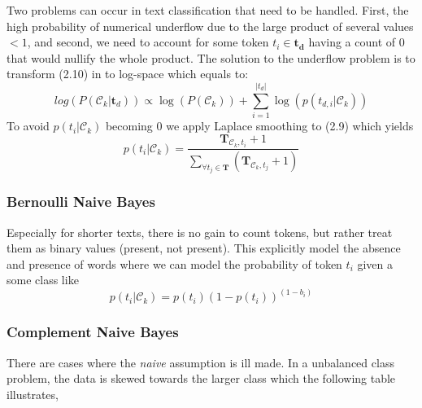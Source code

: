 Two problems can occur in text classification that need to be handled. First, the high probability of numerical underflow due to the large product of several values $<1$, and second, we need to account for some token $t_i \in \boldsymbol{t_d}$ having a count of $0$ that would nullify the whole product. The solution to the underflow problem is to transform (2.10) in to log-space which equals to:
%
\[log(P(\mathcal{C}_k|\boldsymbol{t}_d)) \propto \log(P(\mathcal{C}_k)) + \sum_{i=1}^{|t_{d}|} \log({p(t_{d,i}|\mathcal{C}_k)}) \]
%
To avoid $p({t_{i}}|\mathcal{C}_k)$ becoming $0$ we apply Laplace smoothing to (2.9) which yields
\[p({t_{i}}|\mathcal{C}_k) = \frac{\boldsymbol{T}_{\mathcal{C}_k,t_{i}} + 1}{\sum_{\forall t_j \in \boldsymbol{T}}(\boldsymbol{T}_{\mathcal{C}_k,t_j} + 1)}\]
\subsubsection{Bernoulli Naive Bayes}
Especially for shorter texts, there is no gain to count tokens, but rather treat them as binary values (present, not present). This explicitly model the absence and presence of words where we can model the probability of token $t_i$ given a some class like
\[p(t_{i}|\mathcal{C}_k) = p(t_{i})(1-p(t_{i}))^{(1-b_{i})}\]

\subsubsection{Complement Naive Bayes}
There are cases where the \textsl{naive} assumption is ill made. In a unbalanced class problem, the data is skewed towards the larger class which the following table illustrates,


